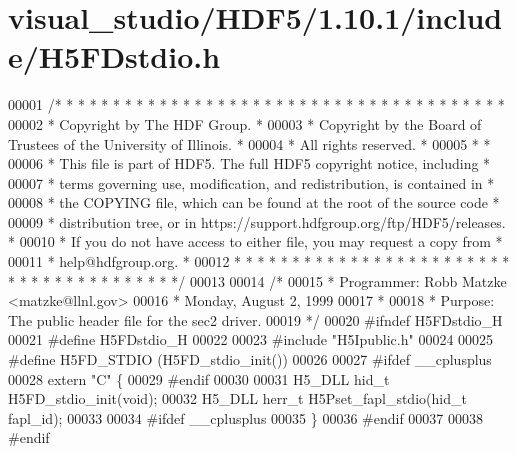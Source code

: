 \hypertarget{visual__studio_2_h_d_f5_21_810_81_2include_2_h5_f_dstdio_8h_source}{}\section{visual\+\_\+studio/\+H\+D\+F5/1.10.1/include/\+H5\+F\+Dstdio.h}
\label{visual__studio_2_h_d_f5_21_810_81_2include_2_h5_f_dstdio_8h_source}

\begin{DoxyCode}
00001 \textcolor{comment}{/* * * * * * * * * * * * * * * * * * * * * * * * * * * * * * * * * * * * * * *}
00002 \textcolor{comment}{ * Copyright by The HDF Group.                                               *}
00003 \textcolor{comment}{ * Copyright by the Board of Trustees of the University of Illinois.         *}
00004 \textcolor{comment}{ * All rights reserved.                                                      *}
00005 \textcolor{comment}{ *                                                                           *}
00006 \textcolor{comment}{ * This file is part of HDF5.  The full HDF5 copyright notice, including     *}
00007 \textcolor{comment}{ * terms governing use, modification, and redistribution, is contained in    *}
00008 \textcolor{comment}{ * the COPYING file, which can be found at the root of the source code       *}
00009 \textcolor{comment}{ * distribution tree, or in https://support.hdfgroup.org/ftp/HDF5/releases.  *}
00010 \textcolor{comment}{ * If you do not have access to either file, you may request a copy from     *}
00011 \textcolor{comment}{ * help@hdfgroup.org.                                                        *}
00012 \textcolor{comment}{ * * * * * * * * * * * * * * * * * * * * * * * * * * * * * * * * * * * * * * */}
00013 
00014 \textcolor{comment}{/*}
00015 \textcolor{comment}{ * Programmer:  Robb Matzke <matzke@llnl.gov>}
00016 \textcolor{comment}{ *              Monday, August  2, 1999}
00017 \textcolor{comment}{ *}
00018 \textcolor{comment}{ * Purpose: The public header file for the sec2 driver.}
00019 \textcolor{comment}{ */}
00020 \textcolor{preprocessor}{#ifndef H5FDstdio\_H}
00021 \textcolor{preprocessor}{#define H5FDstdio\_H}
00022 
00023 \textcolor{preprocessor}{#include "H5Ipublic.h"}
00024 
00025 \textcolor{preprocessor}{#define H5FD\_STDIO  (H5FD\_stdio\_init())}
00026 
00027 \textcolor{preprocessor}{#ifdef \_\_cplusplus}
00028 \textcolor{keyword}{extern} \textcolor{stringliteral}{"C"} \{
00029 \textcolor{preprocessor}{#endif}
00030 
00031 H5\_DLL hid\_t H5FD\_stdio\_init(\textcolor{keywordtype}{void});
00032 H5\_DLL herr\_t H5Pset\_fapl\_stdio(hid\_t fapl\_id);
00033 
00034 \textcolor{preprocessor}{#ifdef \_\_cplusplus}
00035 \}
00036 \textcolor{preprocessor}{#endif}
00037 
00038 \textcolor{preprocessor}{#endif}
\end{DoxyCode}

